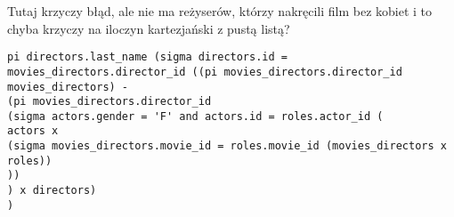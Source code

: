 \documentclass{article}
\begin{document}
\begin{solution}
Tutaj krzyczy błąd, ale nie ma reżyserów, którzy nakręcili film bez kobiet i to chyba krzyczy na iloczyn kartezjański z pustą listą?

\begin{lstlisting}
pi directors.last_name (sigma directors.id = movies_directors.director_id ((pi movies_directors.director_id movies_directors) - 
(pi movies_directors.director_id 
(sigma actors.gender = 'F' and actors.id = roles.actor_id (
actors x 
(sigma movies_directors.movie_id = roles.movie_id (movies_directors x roles))
))
) x directors)
)
\end{lstlisting}

\end{solution}
\end{document}

